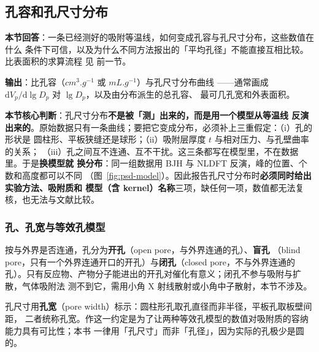 
\subsection{孔容和孔尺寸分布}

\begin{probout}
\textbf{本节回答}：一条已经测好的吸附等温线，如何变成孔容与孔尺寸分布，这些数值在什么
条件下可信，以及为什么不同方法报出的「平均孔径」不能直接互相比较。比表面积的求算流程
见  前一节。

\textbf{输出}：比孔容（$\unit{cm^3.g^{-1}}$ 或 $\unit{mL.g^{-1}}$）与孔尺寸分布曲线
——通常画成 $\mathrm{d}V_p/\mathrm{d}\lg D_p$ 对 $\lg D_p$，以及由分布派生的总孔容、
最可几孔宽和外表面积。

\textbf{本节核心判断}：孔尺寸分布\textbf{不是被「测」出来的，而是用一个模型从等温线
反演出来的}。原始数据只有一条曲线；要把它变成分布，必须补上三重假定：（i）孔的形状是
圆柱形、平板狭缝还是球形；（ii）吸附层厚度 $t$ 与相对压力、与孔壁曲率的关系；
（iii）孔之间互不连通、互不干扰。这三条都写在模型里，不在数据里。于是\textbf{换模型就
换分布}：同一组数据用 BJH 与 NLDFT 反演，峰的位置、个数和高度都可以不同
（图~\ref{fig:psd-model}）。因此报告孔尺寸分布时\textbf{必须同时给出实验方法、吸附质和
模型（含 kernel）名称}三项，缺任何一项，数值都无法复核，也无法与文献比较。
\end{probout}

\subsubsection{孔、孔宽与等效孔模型}

按与外界是否连通，孔分为\textbf{开孔}（open pore，与外界连通的孔）、\textbf{盲孔}
（blind pore，只有一个外界连通开口的开孔）与\textbf{闭孔}（closed pore，不与外界连通的
孔）。只有反应物、产物分子能进出的开孔对催化有意义；闭孔不参与吸附与扩散，气体吸附法
测不到它，需用小角 X 射线散射或小角中子散射，本节不涉及。

孔尺寸用\textbf{孔宽}（pore width）标示：圆柱形孔取孔直径而非半径，平板孔取板壁间距，
二者统称孔宽。作这一约定是为了让两种等效孔模型的数值对吸附质的容纳能力具有可比性；本书
一律用「孔尺寸」而非「孔径」，因为实际的孔极少是圆的。

